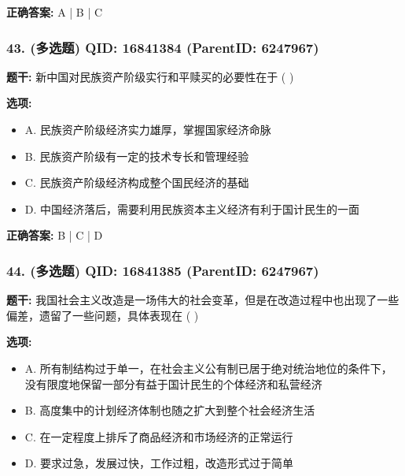 \documentclass[12pt,UTF8]{ctexart}
\begin{document}
\textbf{正确答案:}
A | B | C

\vspace{0.3em}\hrulefill\vspace{0.7em}

\subsubsection*{43. (多选题) \small QID: 16841384 (ParentID: 6247967)}

\textbf{题干:}
新中国对民族资产阶级实行和平赎买的必要性在于 ( )



\textbf{选项:}
\begin{itemize}[leftmargin=*]

  \item A. 民族资产阶级经济实力雄厚，掌握国家经济命脉

  \item B. 民族资产阶级有一定的技术专长和管理经验

  \item C. 民族资产阶级经济构成整个国民经济的基础

  \item D. 中国经济落后，需要利用民族资本主义经济有利于国计民生的一面

\end{itemize}

\textbf{正确答案:}
B | C | D

\vspace{0.3em}\hrulefill\vspace{0.7em}

\subsubsection*{44. (多选题) \small QID: 16841385 (ParentID: 6247967)}

\textbf{题干:}
我国社会主义改造是一场伟大的社会变革，但是在改造过程中也出现了一些偏差，遗留了一些问题，具体表现在 ( )



\textbf{选项:}
\begin{itemize}[leftmargin=*]

  \item A. 所有制结构过于单一，在社会主义公有制已居于绝对统治地位的条件下，没有限度地保留一部分有益于国计民生的个体经济和私营经济

  \item B. 高度集中的计划经济体制也随之扩大到整个社会经济生活

  \item C. 在一定程度上排斥了商品经济和市场经济的正常运行

  \item D. 要求过急，发展过快，工作过粗，改造形式过于简单

\end{itemize}
\end{document}
